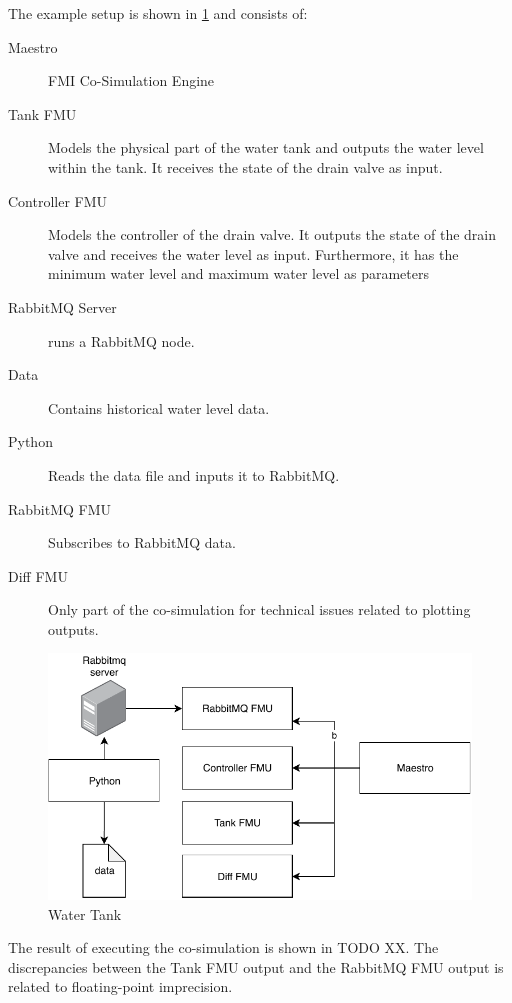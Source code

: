 The example setup is shown in \cref{fig:rabbitmq-example} and consists of:
\begin{description}
  \item[Maestro] FMI Co-Simulation Engine
    \item[Tank FMU] Models the physical part of the water tank and outputs the
    water level within the tank. It receives the state of the drain valve as input.
    \item[Controller FMU] Models the controller of the drain valve. It outputs
    the state of the drain valve and receives the water level as input.
    Furthermore, it has the minimum water level and maximum water level as
    parameters
    \item[RabbitMQ Server] runs a RabbitMQ node.
  \item[Data] Contains historical water level data.
  \item[Python] Reads the data file and inputs it to RabbitMQ.
  \item[RabbitMQ FMU] Subscribes to RabbitMQ data.
    \item[Diff FMU] Only part of the co-simulation for technical issues related to plotting outputs.
\end{description}
\begin{figure}[!htb]
  \centering
  \includegraphics[]{figures/rabbitmq-example.pdf}
  \caption{Water Tank}
  \label{fig:rabbitmq-example}
\end{figure}

The result of executing the co-simulation is shown in TODO XX. The discrepancies
between the Tank FMU output and the RabbitMQ FMU output is related to
floating-point imprecision.



